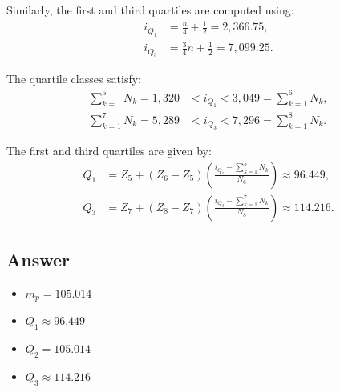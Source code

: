 \documentclass[a4paper,12pt]{article}
\begin{document}
Similarly, the first and third quartiles are computed using:
\begin{align}
i_{Q_1} &= \frac{n}{4} + \frac{1}{2} = 2,366.75, \\
i_{Q_3} &= \frac{3}{4} n + \frac{1}{2} = 7,099.25.
\end{align}

The quartile classes satisfy:
\begin{align}
\sum_{k=1}^{5} N_k = 1,320 &< i_{Q_1} < 3,049 = \sum_{k=1}^{6} N_k, \\
\sum_{k=1}^{7} N_k = 5,289 &< i_{Q_3} < 7,296 = \sum_{k=1}^{8} N_k.
\end{align}

The first and third quartiles are given by:
\begin{align}
Q_1 &= Z_5 + (Z_6 - Z_5) \left( \frac{i_{Q_1} - \sum_{k=1}^{5} N_k}{N_6} \right) \approx 96.449, \\
Q_3 &= Z_7 + (Z_8 - Z_7) \left( \frac{i_{Q_3} - \sum_{k=1}^{7} N_k}{N_8} \right) \approx 114.216.
\end{align}

\subsection*{Answer}
\begin{itemize}
    \item $m_p = 105.014$
    \item $Q_1 \approx 96.449$
    \item $Q_2 = 105.014$
    \item $Q_3 \approx 114.216$
\end{itemize}
\end{document}
